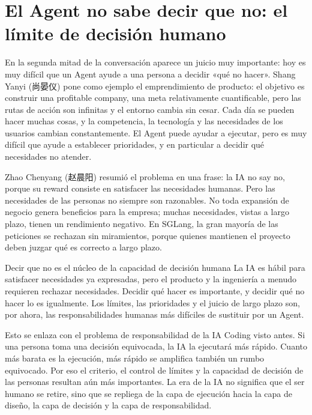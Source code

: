 \section{El Agent no sabe decir que no: el límite de decisión humano}

En la segunda mitad de la conversación aparece un juicio muy importante: hoy es muy difícil que un Agent ayude a una persona a decidir «qué no hacer». Shang Yanyi (尚晏仪) pone como ejemplo el emprendimiento de producto: el objetivo es construir una profitable company, una meta relativamente cuantificable, pero las rutas de acción son infinitas y el entorno cambia sin cesar. Cada día se pueden hacer muchas cosas, y la competencia, la tecnología y las necesidades de los usuarios cambian constantemente. El Agent puede ayudar a ejecutar, pero es muy difícil que ayude a establecer prioridades, y en particular a decidir qué necesidades no atender.

Zhao Chenyang (赵晨阳) resumió el problema en una frase: la IA no say no, porque su reward consiste en satisfacer las necesidades humanas. Pero las necesidades de las personas no siempre son razonables. No toda expansión de negocio genera beneficios para la empresa; muchas necesidades, vistas a largo plazo, tienen un rendimiento negativo. En SGLang, la gran mayoría de las peticiones se rechazan sin miramientos, porque quienes mantienen el proyecto deben juzgar qué es correcto a largo plazo.

\begin{importantbox}{Decir que no es el núcleo de la capacidad de decisión humana}
La IA es hábil para satisfacer necesidades ya expresadas, pero el producto y la ingeniería a menudo requieren rechazar necesidades. Decidir qué hacer es importante, y decidir qué no hacer lo es igualmente. Los límites, las prioridades y el juicio de largo plazo son, por ahora, las responsabilidades humanas más difíciles de sustituir por un Agent.
\end{importantbox}

Esto se enlaza con el problema de responsabilidad de la IA Coding visto antes. Si una persona toma una decisión equivocada, la IA la ejecutará más rápido. Cuanto más barata es la ejecución, más rápido se amplifica también un rumbo equivocado. Por eso el criterio, el control de límites y la capacidad de decisión de las personas resultan aún más importantes. La era de la IA no significa que el ser humano se retire, sino que se repliega de la capa de ejecución hacia la capa de diseño, la capa de decisión y la capa de responsabilidad.

